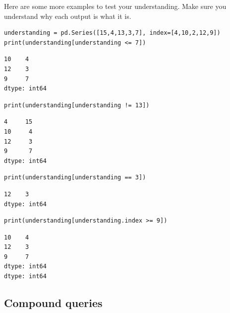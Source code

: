 Here are some more examples to test your understanding. Make sure you
understand why each output is what it is.

\begin{Verbatim}[fontsize=\footnotesize,samepage=true,frame=single,framesep=3mm]
understanding = pd.Series([15,4,13,3,7], index=[4,10,2,12,9])
print(understanding[understanding <= 7])
\end{Verbatim}
\vspace{-.3in}

\begin{Verbatim}[fontsize=\small,samepage=true,frame=leftline,framesep=5mm,framerule=1mm]
10    4
12    3
9     7
dtype: int64
\end{Verbatim}

\begin{Verbatim}[fontsize=\small,samepage=true,frame=single,framesep=3mm]
print(understanding[understanding != 13])
\end{Verbatim}
\vspace{-.3in}

\begin{Verbatim}[fontsize=\small,samepage=true,frame=leftline,framesep=5mm,framerule=1mm]
4     15
10     4
12     3
9      7
dtype: int64
\end{Verbatim}

\begin{Verbatim}[fontsize=\small,samepage=true,frame=single,framesep=3mm]
print(understanding[understanding == 3])
\end{Verbatim}
\vspace{-.3in}

\begin{Verbatim}[fontsize=\small,samepage=true,frame=leftline,framesep=5mm,framerule=1mm]
12    3
dtype: int64
\end{Verbatim}

\begin{Verbatim}[fontsize=\small,samepage=true,frame=single,framesep=3mm]
print(understanding[understanding.index >= 9])
\end{Verbatim}
\vspace{-.3in}

\begin{Verbatim}[fontsize=\small,samepage=true,frame=leftline,framesep=5mm,framerule=1mm]
10    4
12    3
9     7
dtype: int64
dtype: int64
\end{Verbatim}


\subsection{Compound queries}

